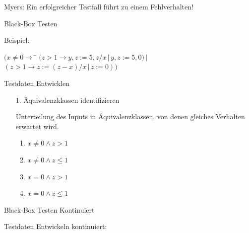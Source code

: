 Myers: Ein erfolgreicher Testfall f\"uhrt zu einem Fehlverhalten!


\newpage
\centerline{Black-Box Testen}

\bigskip

Beispiel:
\begin{tabbing}
$ (x \ne 0 \rightarrow $ \= $( z > 1 \rightarrow y, z := 5, z/x \,|\, y, z := 5,0) \,|\,$ \\
                         \> $( z > 1 \rightarrow z := (z-x) / x \,|\, z := 0))$ \\
\end{tabbing}

Testdaten Entwicklen

\begin{enumerate}

\item[1.] \"Aquivalenzklassen identifizieren

Unterteilung des Inputs in \"Aquivalenzklassen, von denen gleiches
Verhalten erwartet wird.
\begin{enumerate}
\item $x \ne 0 \wedge z >    1$
\item $x \ne 0 \wedge z \leq 1$
\item $x  =  0 \wedge z >    1$
\item $x  =  0 \wedge z \leq 1$
\end{enumerate}

\end{enumerate}

\newpage
\centerline{Black-Box Testen Kontinuiert}

\bigskip

Testdaten Entwickeln kontinuiert:

